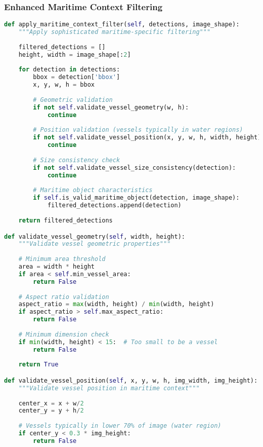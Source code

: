 \documentclass[a4paper,11pt]{article}
\begin{document}
\subsubsection{Enhanced Maritime Context Filtering}
\begin{lstlisting}[language=Python, caption=Advanced Maritime Context Filter]
def apply_maritime_context_filter(self, detections, image_shape):
    """Apply sophisticated maritime-specific filtering"""
    
    filtered_detections = []
    height, width = image_shape[:2]
    
    for detection in detections:
        bbox = detection['bbox']
        x, y, w, h = bbox
        
        # Geometric validation
        if not self.validate_vessel_geometry(w, h):
            continue
            
        # Position validation (vessels typically in water regions)
        if not self.validate_vessel_position(x, y, w, h, width, height):
            continue
            
        # Size consistency check
        if not self.validate_vessel_size_consistency(detection):
            continue
            
        # Maritime object characteristics
        if self.is_valid_maritime_object(detection, image_shape):
            filtered_detections.append(detection)
    
    return filtered_detections

def validate_vessel_geometry(self, width, height):
    """Validate vessel geometric properties"""
    
    # Minimum area threshold
    area = width * height
    if area < self.min_vessel_area:
        return False
    
    # Aspect ratio validation
    aspect_ratio = max(width, height) / min(width, height)
    if aspect_ratio > self.max_aspect_ratio:
        return False
    
    # Minimum dimension check
    if min(width, height) < 15:  # Too small to be a vessel
        return False
        
    return True

def validate_vessel_position(self, x, y, w, h, img_width, img_height):
    """Validate vessel position in maritime context"""
    
    center_x = x + w/2
    center_y = y + h/2
    
    # Vessels typically in lower 70% of image (water region)
    if center_y < 0.3 * img_height:
        return False
    

\end{lstlisting}
\end{document}
